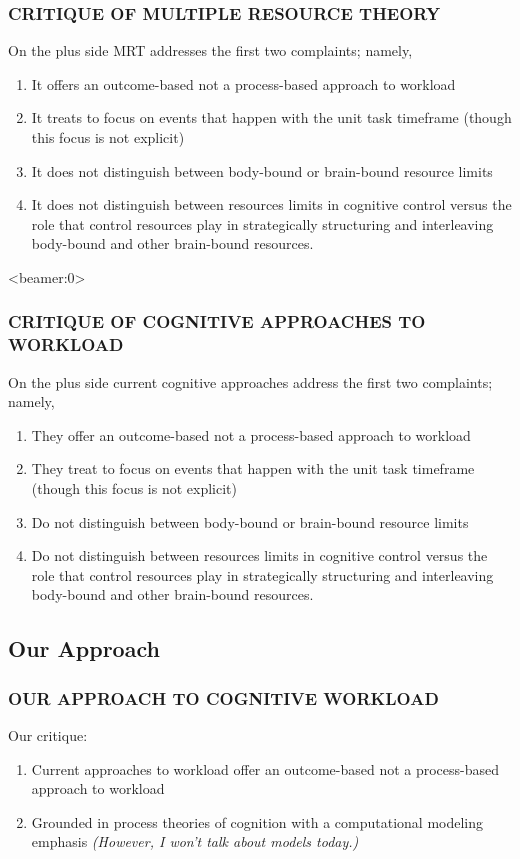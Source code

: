\documentclass{beamer}
\begin{document}
\begin{frame}  %
	\frametitle{CRITIQUE OF MULTIPLE RESOURCE THEORY}
On the plus side MRT addresses the first two complaints; namely,
	\begin{enumerate}
		\item It offers an outcome-based not a process-based approach to workload
		\item It treats to focus on events that happen with the unit task timeframe (though this focus is not explicit)
	\pause
	\pause
		\item It does not distinguish between body-bound or brain-bound resource limits
		\item It does not distinguish between resources limits in cognitive control versus the role that control resources play in strategically structuring and interleaving body-bound and other brain-bound resources.
	\end{enumerate}
\end{frame}

\begin{frame}<beamer:0>
	\frametitle{CRITIQUE OF COGNITIVE APPROACHES TO WORKLOAD}
On the plus side current cognitive approaches address the first two complaints; namely,
	\begin{enumerate}
		\item They offer an outcome-based not a process-based approach to workload
		\item They treat to focus on events that happen with the unit task timeframe (though this focus is not explicit)
	\pause
		\item Do not distinguish between body-bound or brain-bound resource limits
		\item Do not distinguish between resources limits in cognitive control versus the role that control resources play in strategically structuring and interleaving body-bound and other brain-bound resources.
	\end{enumerate}
\end{frame}


\subsection{Our Approach}

\begin{frame}
	\frametitle{OUR APPROACH TO COGNITIVE WORKLOAD}
Our critique:
	\begin{enumerate}[<+-| alert@+>]
		\item Current approaches to workload offer an outcome-based not a process-based approach to workload
		\setcounter{enumi}{0}
		\item Grounded in process theories of cognition with a computational modeling emphasis \emph{(However, I won't talk about models today.)}
	\end{enumerate}
\end{frame}
\end{document}
